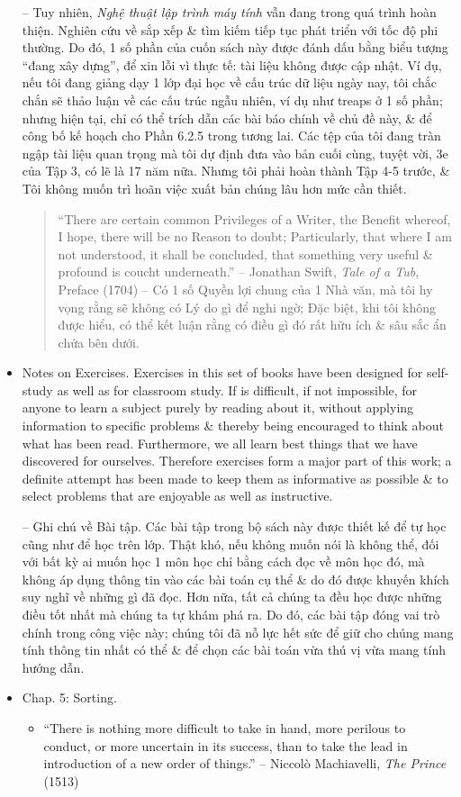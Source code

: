 \documentclass{article}
\begin{document}
\begin{itemize}
    -- Tuy nhiên, {\it Nghệ thuật lập trình máy tính} vẫn đang trong quá trình hoàn thiện. Nghiên cứu về sắp xếp \& tìm kiếm tiếp tục phát triển với tốc độ phi thường. Do đó, 1 số phần của cuốn sách này được đánh dấu bằng biểu tượng ``đang xây dựng'', để xin lỗi vì thực tế: tài liệu không được cập nhật. Ví dụ, nếu tôi đang giảng dạy 1 lớp đại học về cấu trúc dữ liệu ngày nay, tôi chắc chắn sẽ thảo luận về các cấu trúc ngẫu nhiên, ví dụ như treaps ở 1 số phần; nhưng hiện tại, chỉ có thể trích dẫn các bài báo chính về chủ đề này, \& để công bố kế hoạch cho Phần 6.2.5 trong tương lai. Các tệp của tôi đang tràn ngập tài liệu quan trọng mà tôi dự định đưa vào bản cuối cùng, tuyệt vời, 3e của Tập 3, có lẽ là 17 năm nữa. Nhưng tôi phải hoàn thành Tập 4-5 trước, \& Tôi không muốn trì hoãn việc xuất bản chúng lâu hơn mức cần thiết.
    \begin{quotation}
        ``There are certain common Privileges of a Writer, the Benefit whereof, I hope, there will be no Reason to doubt; Particularly, that where I am not understood, it shall be concluded, that something very useful \& profound is coucht underneath.'' -- {\sc Jonathan Swift}, {\it Tale of a Tub}, Preface (1704) -- Có 1 số Quyền lợi chung của 1 Nhà văn, mà tôi hy vọng rằng sẽ không có Lý do gì để nghi ngờ; Đặc biệt, khi tôi không được hiểu, có thể kết luận rằng có điều gì đó rất hữu ích \& sâu sắc ẩn chứa bên dưới.
    \end{quotation}
    \item {\sf Notes on Exercises.} Exercises in this set of books have been designed for self-study as well as for classroom study. If is difficult, if not impossible, for anyone to learn a subject purely by reading about it, without applying information to specific problems \& thereby being encouraged to think about what has been read. Furthermore, we all learn best things that we have discovered for ourselves. Therefore exercises form a major part of this work; a definite attempt has been made to keep them as informative as possible \& to select problems that are enjoyable as well as instructive.
    
    -- {\sf Ghi chú về Bài tập.} Các bài tập trong bộ sách này được thiết kế để tự học cũng như để học trên lớp. Thật khó, nếu không muốn nói là không thể, đối với bất kỳ ai muốn học 1 môn học chỉ bằng cách đọc về môn học đó, mà không áp dụng thông tin vào các bài toán cụ thể \& do đó được khuyến khích suy nghĩ về những gì đã đọc. Hơn nữa, tất cả chúng ta đều học được những điều tốt nhất mà chúng ta tự khám phá ra. Do đó, các bài tập đóng vai trò chính trong công việc này; chúng tôi đã nỗ lực hết sức để giữ cho chúng mang tính thông tin nhất có thể \& để chọn các bài toán vừa thú vị vừa mang tính hướng dẫn.
    \item {\sf Chap. 5: Sorting.}
    \begin{itemize}
        \item ``There is nothing more difficult to take in hand, more perilous to conduct, or more uncertain in its success, than to take the lead in introduction of a new order of things.'' -- {\sc Niccol\`o Machiavelli}, {\it The Prince} (1513)
        

\end{itemize}
\end{itemize}
\end{document}
